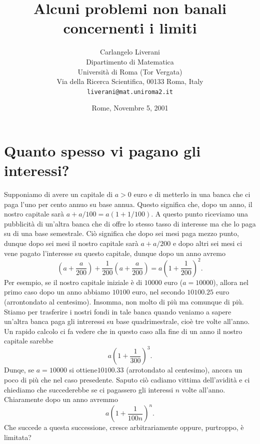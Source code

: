 \documentclass[10pt, twoside]{article}
\numberwithin{equation}{section}
\begin{document}
\title{\bfseries Alcuni problemi non banali concernenti i limiti}
\author{{\sc Carlangelo Liverani}\\
Dipartimento di Matematica\\
Universit\`{a} di Roma (Tor Vergata)\\
Via della Ricerca Scientifica, 00133 Roma, Italy\\
{\tt liverani@mat.uniroma2.it}}
\date{Rome, Novembre 5, 2001}
\maketitle


\section{\sc \large Quanto spesso vi pagano gli interessi?}

Supponiamo di avere un capitale  di $a>0$ euro e di metterlo in una
banca che ci paga l'uno per cento annuo su base annua. Questo significa che, dopo un
anno, il nostro capitale sar\`a $a+a/100=a(1+1/100)$. A questo punto riceviamo
una pubblicit\`a di un'altra banca che di offre lo stesso tasso di
interesse ma che lo paga su di una base semestrale. Ci\`o significa
che dopo sei mesi paga mezzo punto, dunque dopo sei mesi il nostro
capitale sar\`a $a+a/200$ e dopo altri sei mesi ci vene pagato
l'interesse su questo capitale, dunque dopo un anno avremo
\[
\left(a+\frac a{200}\right)+\frac 1{200}\left(a+\frac a{200}\right)=
a\left(1+\frac 1{200}\right)^2.
\]
Per esempio, se il nostro capitale iniziale \`e di $10000$ euro
($a=10000$),
allora nel primo caso dopo un anno abbiamo $10100$ euro, nel secondo
$10100.25$ euro (arrontondato al centesimo). Insomma, non molto di
pi\`u ma comunque di pi\`u. Stiamo per trasferire i nostri fondi in
tale banca quando veniamo a sapere un'altra banca paga
gli intreressi su base quadrimestrale, cio\`e tre volte all'anno. Un
rapido calcolo ci fa vedere che in questo caso alla fine di un anno il
nostro capitale sarebbe
\[
a\left(1+\frac 1{300}\right)^3.
\]
Dunqe, se $a=10000$ si ottiene$10100.33$ (arrotondato al centesimo),
ancora un poco di pi\`u che nel caso presedente. Saputo ci\`o cadiamo
vittima dell'avidit\`a e ci chiediamo che succederebbe se
ci pagassero gli interessi $n$ volte all'anno. Chiaramente dopo un
anno avremmo
\begin{equation}\label{eq:standard}
a\left(1+\frac 1{100 n}\right)^n.
\end{equation}
Che succede a questa successione, cresce arbitrariamente oppure,
purtroppo, \`e limitata?
\end{document}
